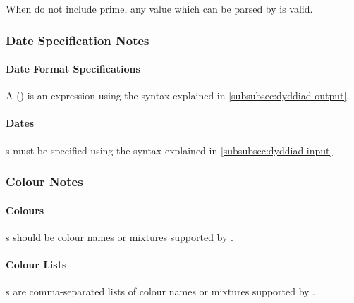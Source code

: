 \documentclass[10pt,british,a4paper]{ltxdoc}
\newcommand*\pkg[1]{\textpkg{#1}}
\begin{document}
When \dimkeyslabelname{} do not include prime, any value which can be parsed by  is valid.


\subsubsection{Date Specification Notes}\label{subsubsec:nodiadau-dyddiadau}

\paragraph{Date Format Specifications\label{nod:fformatiau-dyddiadau}}
A  () is an expression using the syntax explained in \cref{subsubsec:dyddiad-output}.

\paragraph{Dates\label{nod:dyddiadau}}
s must be specified using the syntax explained in \cref{subsubsec:dyddiad-input}.



\subsubsection{Colour Notes}\label{subsubsec:nodiadau-lliwiau}

\paragraph{Colours\label{nod:lliwiau}}
s should be colour names or mixtures supported by \pkg{xcolor}.

\paragraph{Colour Lists\label{nod:rhestrau-lliwiau}}
s are comma-separated lists of colour names or mixtures supported by \pkg{xcolor}.
\end{document}
